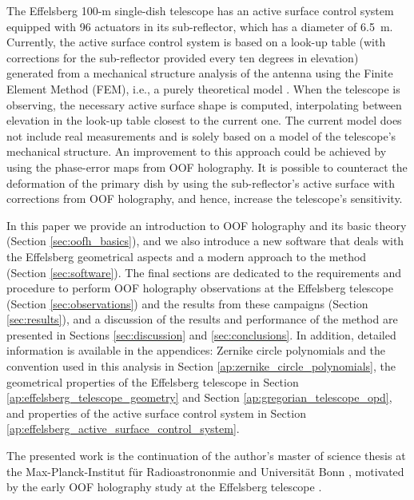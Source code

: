 \documentclass[
    ]
    {aa}
\begin{document}
    The Effelsberg 100-m single-dish telescope has an active surface control system equipped with \num{96} actuators in its sub-reflector, which has a diameter of \SI{6.5}{\metre}. 
    Currently, the active surface control system is based on a look-up table (with corrections for the sub-reflector provided every ten degrees in elevation) generated from a mechanical structure analysis of the antenna using the Finite Element Method (FEM), i.e., a purely theoretical model \citep[see][Chapter~5]{doyle2002integrated}.
    When the telescope is observing, the necessary active surface shape is computed, interpolating between elevation in the look-up table closest to the current one. The current model does not include real measurements and is solely based on a model of the telescope's mechanical structure.
    An improvement to this approach could be achieved by using the phase-error maps from OOF holography. It is possible to counteract the deformation of the primary dish by using the sub-reflector's active surface with corrections from OOF holography, and hence, increase the telescope's sensitivity.

    In this paper we provide an introduction to OOF holography and its basic theory (Section \ref{sec:oofh_basics}), and we also introduce a new software that deals with the Effelsberg geometrical aspects and a modern approach to the method (Section \ref{sec:software}). The final sections are dedicated to the requirements and procedure to perform OOF holography observations at the Effelsberg telescope (Section \ref{sec:observations}) and the results from these campaigns (Section \ref{sec:results}), and a discussion of the results and performance of the method are presented in Sections \ref{sec:discussion} and \ref{sec:conclusions}. 
    In addition, detailed information is available in the appendices: Zernike circle polynomials and the convention used in this analysis in Section \ref{ap:zernike_circle_polynomials}, the geometrical properties of the Effelsberg telescope in Section \ref{ap:effelsberg_telescope_geometry} and Section \ref{ap:gregorian_telescope_opd}, and properties of the active surface control system in Section \ref{ap:effelsberg_active_surface_control_system}.

    The presented work is the continuation of the author's master of science thesis at the Max-Planck-Institut f\"ur Radioastrononmie and Universit\"{a}t Bonn \citep{cassanelli2017oofh}, motivated by the early OOF holography study at the Effelsberg telescope \citep{2014evn..confE..36B}.
\end{document}
